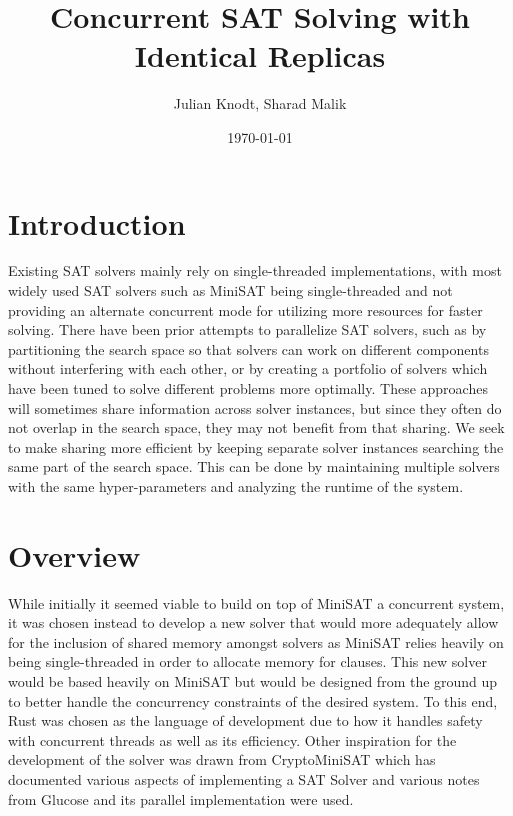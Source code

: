 \documentclass[11pt]{extarticle}
\title{Concurrent SAT Solving with Identical Replicas}
\author{Julian Knodt, Sharad Malik}
\date{\today}
\begin{document}
\maketitle


\section*{Introduction}
Existing SAT solvers mainly rely on single-threaded implementations, with most widely used SAT
solvers such as MiniSAT being single-threaded and not providing an alternate concurrent mode for
utilizing more resources for faster solving. There have been prior attempts to parallelize SAT
solvers, such as by partitioning the search space so that solvers can work on different
components without interfering with each other, or by creating a portfolio of solvers which have
been tuned to solve different problems more optimally. These approaches will sometimes share
information across solver instances, but since they often do not overlap in the search space,
they may not benefit from that sharing. We seek to make sharing more efficient by keeping
separate solver instances searching the same part of the search space. This can be done by
maintaining multiple solvers with the same hyper-parameters and analyzing the runtime of the
system.
\section*{Overview}
While initially it seemed viable to build on top of MiniSAT a concurrent system, it was chosen
instead to develop a new solver that would more adequately allow for the
inclusion of shared memory amongst solvers as MiniSAT relies heavily on being single-threaded in
order to allocate memory for clauses. This new solver would be based heavily on MiniSAT but
would be designed from the ground up to better handle the concurrency constraints of the
desired system. To this end, Rust was chosen as
the language of development due to how it handles safety with concurrent threads as well as its
efficiency. Other inspiration for the development of the solver was drawn from CryptoMiniSAT
\cite{cryptoms} which has documented various aspects of implementing a SAT
Solver and various notes from Glucose\cite{glucose} and its parallel implementation were used.
\end{document}
